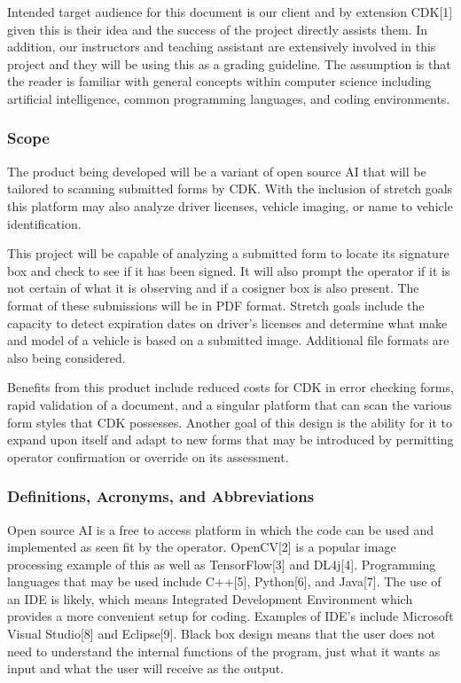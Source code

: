 \documentclass[article, onecolumn, draftclsnofoot,10pt, compsoc]{IEEEtran}
\begin{document}
Intended target audience for this document is our client and by extension CDK[1] given this is their idea and the success of the project directly assists them. In addition, our instructors and teaching assistant are extensively involved in this project and they will be using this as a grading guideline. The assumption is that the reader is familiar with general concepts within computer science including artificial intelligence, common programming languages, and coding environments.


\subsubsection{Scope}
The product being developed will be a variant of open source AI that will be tailored to scanning submitted forms by CDK. With the inclusion of stretch goals this platform may also analyze driver licenses, vehicle imaging, or name to vehicle identification. 

This project will be capable of analyzing a submitted form to locate its signature box and check to see if it has been signed. It will also prompt the operator if it is not certain of what it is observing and if a cosigner box is also present. The format of these submissions will be in PDF format. Stretch goals include the capacity to detect expiration dates on driver’s licenses and determine what make and model of a vehicle is based on a submitted image. Additional file formats are also being considered.

Benefits from this product include reduced costs for CDK in error checking forms, rapid validation of a document, and a singular platform that can scan the various form styles that CDK possesses. Another goal of this design is the ability for it to expand upon itself and adapt to new forms that may be introduced by permitting operator confirmation or override on its assessment. 

\subsubsection{Definitions, Acronyms, and Abbreviations}
Open source AI is a free to access platform in which the code can be used and implemented as seen fit by the operator. OpenCV[2] is a popular image processing example of this as well as TensorFlow[3] and DL4j[4]. Programming languages that may be used include C++[5], Python[6], and Java[7]. The use of an IDE is likely, which means Integrated Development Environment which provides a more convenient setup for coding. Examples of IDE’s include Microsoft Visual Studio[8] and Eclipse[9]. Black box design means that the user does not need to understand the internal functions of the program, just what it wants as input and what the user will receive as the output. 
\end{document}

